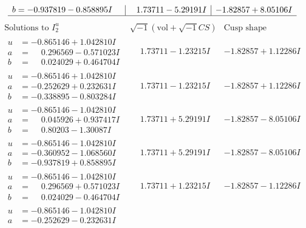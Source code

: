 \documentclass[1p]{elsarticle_modified}
\theoremstyle{definition}
\newcommand{\I}{\sqrt{-1}}
\begin{document}
$$\begin{array}{c|c|c}
\begin{aligned}
b &= -0.937819 - 0.858895 I\end{aligned}
 & \phantom{-}1.73711 - 5.29191 I & -1.82857 + 8.05106 I\\
 \hline 
 \end{array}$$\newpage$$\begin{array}{c|c|c}  
\text{Solutions to }I^u_{2}& \I (\text{vol} + \sqrt{-1}CS) & \text{Cusp shape}\\
 \hline 
\begin{aligned}
u &= -0.865146 + 1.042810 I \\
a &= \phantom{-}0.296569 - 0.571023 I \\
b &= \phantom{-}0.024029 + 0.464704 I\end{aligned}
 & \phantom{-}1.73711 - 1.23215 I & -1.82857 + 1.12286 I \\ \hline\begin{aligned}
u &= -0.865146 + 1.042810 I \\
a &= -0.252629 + 0.232631 I \\
b &= -0.338895 - 0.803284 I\end{aligned}
 & \phantom{-}1.73711 - 1.23215 I & -1.82857 + 1.12286 I \\ \hline\begin{aligned}
u &= -0.865146 - 1.042810 I \\
a &= \phantom{-}0.045926 + 0.937417 I \\
b &= \phantom{-}0.80203 - 1.30087 I\end{aligned}
 & \phantom{-}1.73711 + 5.29191 I & -1.82857 - 8.05106 I \\ \hline\begin{aligned}
u &= -0.865146 - 1.042810 I \\
a &= -0.360952 - 1.068560 I \\
b &= -0.937819 + 0.858895 I\end{aligned}
 & \phantom{-}1.73711 + 5.29191 I & -1.82857 - 8.05106 I \\ \hline\begin{aligned}
u &= -0.865146 - 1.042810 I \\
a &= \phantom{-}0.296569 + 0.571023 I \\
b &= \phantom{-}0.024029 - 0.464704 I\end{aligned}
 & \phantom{-}1.73711 + 1.23215 I & -1.82857 - 1.12286 I \\ \hline\begin{aligned}
u &= -0.865146 - 1.042810 I \\
a &= -0.252629 - 0.232631 I \\

\end{aligned}
\end{array}$$
\end{document}
